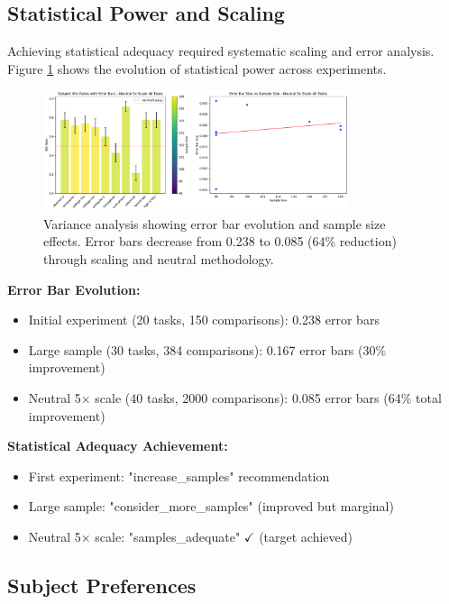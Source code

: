 \documentclass[11pt,a4paper]{article}
\begin{document}
\subsection{Statistical Power and Scaling}

Achieving statistical adequacy required systematic scaling and error analysis. Figure \ref{fig:variance} shows the evolution of statistical power across experiments.

\begin{figure}[h]
    \centering
    \includegraphics[width=0.8\textwidth]{figures/neutral_variance_analysis.pdf}
    \caption{Variance analysis showing error bar evolution and sample size effects. Error bars decrease from 0.238 to 0.085 (64\% reduction) through scaling and neutral methodology.}
    \label{fig:variance}
\end{figure}

\textbf{Error Bar Evolution:}
\begin{itemize}
    \item Initial experiment (20 tasks, 150 comparisons): 0.238 error bars
    \item Large sample (30 tasks, 384 comparisons): 0.167 error bars (30\% improvement)
    \item Neutral 5× scale (40 tasks, 2000 comparisons): 0.085 error bars (64\% total improvement)
\end{itemize}

\textbf{Statistical Adequacy Achievement:}
\begin{itemize}
    \item First experiment: "increase\_samples" recommendation
    \item Large sample: "consider\_more\_samples" (improved but marginal)
    \item Neutral 5× scale: "samples\_adequate" $\checkmark$ (target achieved)
\end{itemize}

\subsection{Subject Preferences}
\end{document}

